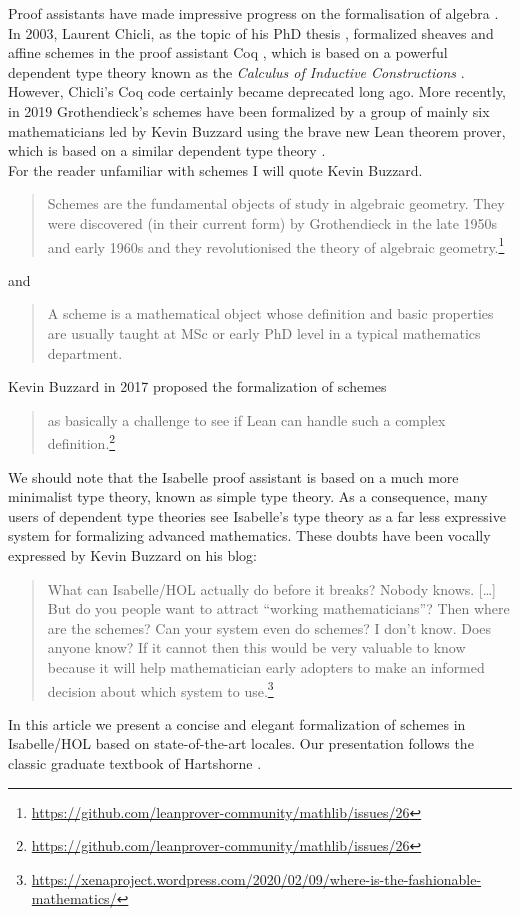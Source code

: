 \documentclass[12pt]{scrartcl}
\begin{document}
Proof assistants have made impressive progress on the formalisation of algebra \cite{oddorderthm}. In 2003, Laurent Chicli, as the topic of his PhD thesis \cite{chiclithesis}, formalized sheaves and affine schemes in the proof assistant Coq \cite{coqrefmanual}, which is based on a powerful dependent type theory known as the \emph{Calculus of Inductive Constructions} \cite{coquand1986calculus, coquand1988inductively}. However, Chicli's Coq code certainly became deprecated long ago. More recently, in 2019 Grothendieck's schemes \cite{GrothendieckEGAI} have been formalized by a group of mainly six mathematicians led by Kevin Buzzard \cite{schemesinLean} using the brave new Lean theorem prover, which is based on a similar dependent type theory \cite{de2015lean}. \\
For the reader unfamiliar with schemes I will quote Kevin Buzzard.
\begin{quote}
	Schemes are the fundamental objects of study in algebraic geometry. They were discovered (in their current form) by Grothendieck in the late 1950s and early 1960s and they revolutionised the theory of algebraic geometry.\footnote{\url{https://github.com/leanprover-community/mathlib/issues/26}} 
\end{quote}
and
\begin{quote}
	A scheme is a mathematical object whose definition and basic properties are usually taught at MSc or early PhD level in a typical mathematics department.
\end{quote}	
Kevin Buzzard in 2017 proposed the formalization of schemes 
\begin{quote}
	as basically a challenge to see if Lean can handle such a complex definition.\footnote{\url{https://github.com/leanprover-community/mathlib/issues/26}} 
\end{quote}
We should note that the Isabelle proof assistant is based on a much more minimalist type theory, known as simple type theory. As a consequence, many users of dependent type theories see Isabelle's type theory as a far less expressive system for formalizing advanced mathematics.  These doubts have been vocally expressed by Kevin Buzzard on his blog:
\begin{quote}
	What can Isabelle/HOL actually do before it breaks? Nobody knows. [\dots] But do you people want to attract “working mathematicians”? Then where are the schemes? Can your system even do schemes? I don’t know. Does anyone know? If it cannot then this would be very valuable to know because it will help mathematician early adopters to make an informed decision about which system to use.\footnote{\url{https://xenaproject.wordpress.com/2020/02/09/where-is-the-fashionable-mathematics/}}
\end{quote}
In this article we present a concise and elegant formalization of schemes in Isabelle/HOL based on state-of-the-art locales. Our presentation follows the classic graduate textbook of Hartshorne \cite{hartshorne}. 			
\end{document}
